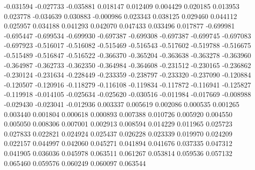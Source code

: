 -0.031594
-0.027733
-0.035881
0.018147
0.012409
0.004429
0.020185
0.013953
0.023778
-0.034639
0.030883
-0.000986
0.023343
0.038125
0.029460
0.044112
0.025957
0.034188
0.041293
0.042070
0.047433
0.033496
0.017877
-0.699981
-0.695447
-0.699534
-0.699930
-0.697387
-0.699308
-0.697387
-0.699745
-0.697083
-0.697923
-0.516017
-0.516082
-0.515469
-0.516543
-0.517602
-0.519788
-0.516675
-0.515489
-0.516847
-0.516522
-0.366370
-0.365204
-0.363638
-0.363278
-0.363960
-0.364987
-0.362733
-0.362350
-0.364984
-0.364608
-0.231512
-0.230165
-0.236862
-0.230124
-0.231634
-0.228449
-0.233359
-0.238797
-0.233320
-0.237090
-0.120884
-0.120507
-0.120916
-0.118279
-0.116108
-0.119834
-0.117872
-0.116941
-0.125827
-0.119918
-0.014105
-0.025634
-0.025620
-0.030516
-0.011984
-0.017669
-0.008988
-0.029430
-0.023041
-0.012936
0.003337
0.005619
0.002086
0.000535
0.001265
0.003440
0.001804
0.000618
0.000893
0.007388
0.010726
0.005920
0.004550
0.005050
0.008306
0.007001
0.002913
0.008594
0.014229
0.011965
0.025723
0.027833
0.022821
0.024924
0.025437
0.026228
0.023339
0.019970
0.024209
0.022157
0.044997
0.042060
0.045271
0.041894
0.041676
0.037335
0.047312
0.041905
0.036036
0.045978
0.063511
0.061267
0.053814
0.059536
0.057132
0.065460
0.059576
0.060249
0.060097
0.063544
